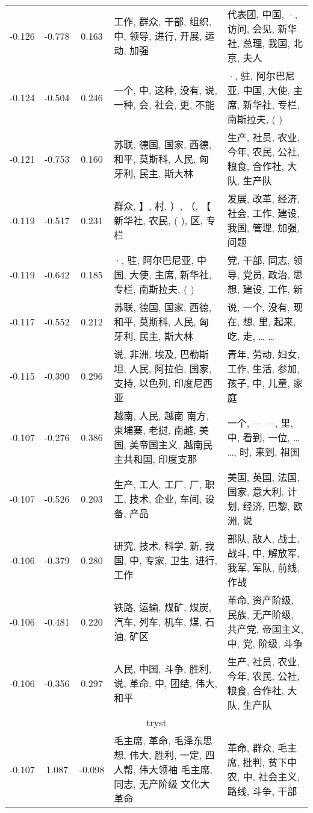 \begin{tabular}{cccp{5cm}p{5cm}}
-0.126 & -0.778 & 0.163 & 工作, 群众, 干部, 组织, 中, 领导, 进行, 开展, 运动, 加强 & 代表团, 中国, ·, 访问, 会见, 新华社, 总理, 我国, 北京, 夫人 \\
-0.124 & -0.504 & 0.246 & 一个, 中, 这种, 没有, 说, 一种, 会, 社会, 更, 不能 & ·, 驻, 阿尔巴尼亚, 中国, 大使, 主席, 新华社, 专栏, 南斯拉夫, ( ) \\
-0.121 & -0.753 & 0.160 & 苏联, 德国, 国家, 西德, 和平, 莫斯科, 人民, 匈牙利, 民主, 斯大林 & 生产, 社员, 农业, 今年, 农民, 公社, 粮食, 合作社, 大队, 生产队 \\
-0.119 & -0.517 & 0.231 & 群众, 】, 村, ）, （, 【 新华社, 农民, ( ), 区, 专栏 & 发展, 改革, 经济, 社会, 工作, 建设, 我国, 管理, 加强, 问题 \\
-0.119 & -0.642 & 0.185 & ·, 驻, 阿尔巴尼亚, 中国, 大使, 主席, 新华社, 专栏, 南斯拉夫, ( ) & 党, 干部, 同志, 领导, 党员, 政治, 思想, 建设, 工作, 新 \\
-0.117 & -0.552 & 0.212 & 苏联, 德国, 国家, 西德, 和平, 莫斯科, 人民, 匈牙利, 民主, 斯大林 & 说, 一个, 没有, 现在, 想, 里, 起来, 吃, 走, … … \\
-0.115 & -0.390 & 0.296 & 说, 非洲, 埃及, 巴勒斯坦, 人民, 阿拉伯, 国家, 支持, 以色列, 印度尼西亚 & 青年, 劳动, 妇女, 工作, 生活, 参加, 孩子, 中, 儿童, 家庭 \\
-0.107 & -0.276 & 0.386 & 越南, 人民, 越南 南方, 柬埔寨, 老挝, 南越, 美国, 美帝国主义, 越南民主共和国, 印度支那 & 一个, — —, 里, 中, 看到, 一位, … …, 时, 来到, 祖国 \\
-0.107 & -0.526 & 0.203 & 生产, 工人, 工厂, 厂, 职工, 技术, 企业, 车间, 设备, 产品 & 美国, 英国, 法国, 国家, 意大利, 计划, 经济, 巴黎, 欧洲, 说 \\
-0.106 & -0.379 & 0.280 & 研究, 技术, 科学, 新, 我国, 中, 专家, 卫生, 进行, 工作 & 部队, 敌人, 战士, 战斗, 中, 解放军, 我军, 军队, 前线, 作战 \\
-0.106 & -0.481 & 0.220 & 铁路, 运输, 煤矿, 煤炭, 汽车, 列车, 机车, 煤, 石油, 矿区 & 革命, 资产阶级, 民族, 无产阶级, 共产党, 帝国主义, 中, 党, 阶级, 斗争 \\
-0.106 & -0.356 & 0.297 & 人民, 中国, 斗争, 胜利, 说, 革命, 中, 团结, 伟大, 和平 & 生产, 社员, 农业, 今年, 农民, 公社, 粮食, 合作社, 大队, 生产队 \\
\midrule
\multicolumn{5}{c}{tryst}\\
-0.107 & 1.087 & -0.098 & 毛主席, 革命, 毛泽东思想, 伟大, 胜利, 一定, 四人帮, 伟大领袖 毛主席, 同志, 无产阶级 文化大革命 & 革命, 群众, 毛主席, 批判, 贫下中农, 中, 社会主义, 路线, 斗争, 干部 \\

\end{tabular}
